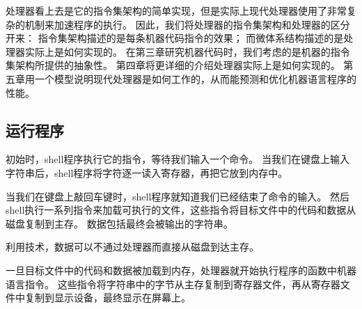 {{{            处理器看上去是它的指令集架构的简单实现，但是实际上现代处理器使用了非常复杂的机制来加速程序的执行。
            因此，我们将处理器的指令集架构和处理器的区分开来：
            指令集架构描述的是每条机器代码指令的效果；
            而微体系结构描述的是处理器实际上是如何实现的。
            在第三章研究机器代码时，我们考虑的是机器的指令集架构所提供的抽象性。
            第四章将更详细的介绍处理器实际上是如何实现的。
            第五章用一个模型说明现代处理器是如何工作的，从而能预测和优化机器语言程序的性能。
        }
    }

    \subsection{运行程序}
    {
        初始时，shell程序执行它的指令，等待我们输入一个命令。
        当我们在键盘上输入字符串后，shell程序将字符逐一读入寄存器，再把它放到内存中。

        当我们在键盘上敲回车键时，shell程序就知道我们已经结束了命令的输入。
        然后shell执行一系列指令来加载可执行的文件，这些指令将目标文件中的代码和数据从磁盘复制到主存。
        数据包括最终会被输出的字符串。

        利用技术，数据可以不通过处理器而直接从磁盘到达主存。

        一旦目标文件中的代码和数据被加载到内存，处理器就开始执行程序的函数中机器语言指令。
        这些指令将字符串中的字节从主存复制到寄存器文件，再从寄存器文件中复制到显示设备，最终显示在屏幕上。
    }
}

\endinput
